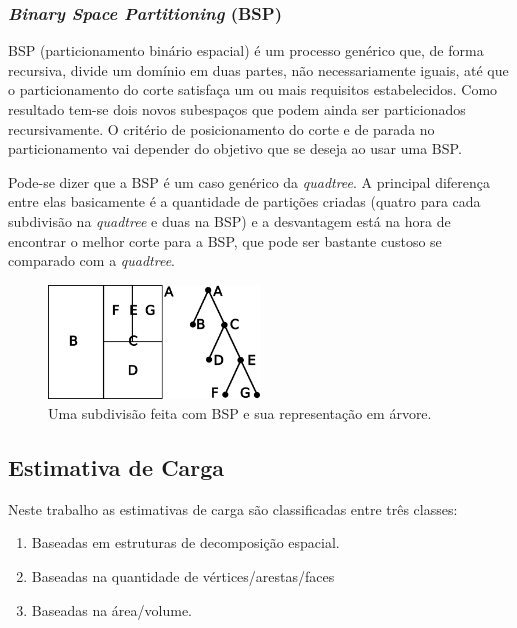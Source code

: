 \subsubsection{\textit{Binary Space Partitioning} (BSP)}


BSP (particionamento binário espacial) é um processo genérico que, de forma recursiva, divide um domínio em duas partes, não necessariamente iguais, até que o particionamento do corte satisfaça um ou mais requisitos estabelecidos. Como resultado tem-se dois novos subespaços que podem ainda ser particionados recursivamente. O critério de posicionamento do corte e de parada no particionamento vai depender do objetivo que se deseja ao usar uma BSP. 

Pode-se dizer que a BSP é um caso genérico da \textit{quadtree}. A principal diferença entre elas basicamente é a quantidade de partições criadas (quatro para cada subdivisão na \textit{quadtree} e duas na BSP) e a desvantagem está na hora de encontrar o melhor corte para a BSP, que pode ser bastante custoso se comparado com a \textit{quadtree}.

 \begin{figure}[htbp]
     \centering
     \includegraphics[width=0.5\textwidth]{fig/ex_BSP.png}
     \caption{Uma subdivisão feita com BSP e sua representação em árvore.} 
     \label{fig:ex_BSP}
 \end{figure}



\subsection{Estimativa de Carga} 

Neste trabalho as estimativas de carga são classificadas entre três classes:

 \begin{enumerate}
	\item{Baseadas em estruturas de decomposição espacial.}
 	\item{Baseadas na quantidade de vértices/arestas/faces}
 	\item{Baseadas na área/volume.}
 \end{enumerate}

